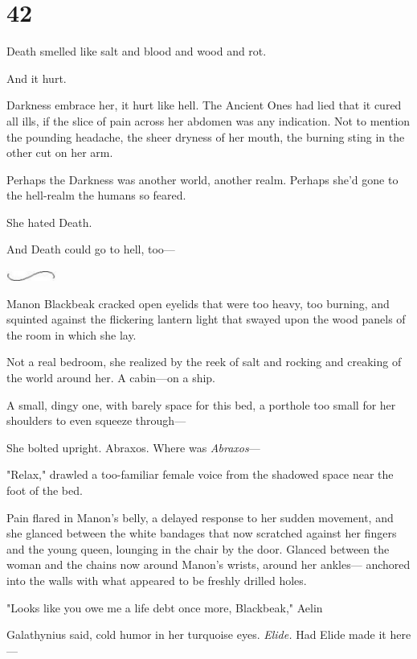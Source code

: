 
\chapter{42}

Death smelled like salt and blood and wood and rot.

And it hurt.

Darkness embrace her, it hurt like hell. The Ancient Ones had lied that it cured all ills, if the slice of pain across her abdomen was any indication. Not to mention the pounding headache, the sheer dryness of her mouth, the burning sting in the other cut on her arm.

Perhaps the Darkness was another world, another realm. Perhaps she'd gone to the hell-realm the humans so feared.

She hated Death.

And Death could go to hell, too---

\includegraphics[width=0.65in,height=0.13in]{images/seperator}

Manon Blackbeak cracked open eyelids that were too heavy, too burning, and squinted against the flickering lantern light that swayed upon the wood panels of the room in which she lay.

Not a real bedroom, she realized by the reek of salt and rocking and creaking of the world around her. A cabin---on a ship.

A small, dingy one, with barely space for this bed, a porthole too small for her shoulders to even squeeze through---

She bolted upright. Abraxos. Where was \emph{Abraxos}---

"Relax," drawled a too-familiar female voice from the shadowed space near the foot of the bed.

Pain flared in Manon's belly, a delayed response to her sudden movement, and she glanced between the white bandages that now scratched against her fingers and the young queen, lounging in the chair by the door. Glanced between the woman and the chains now around Manon's wrists, around her ankles--- anchored into the walls with what appeared to be freshly drilled holes.

"Looks like you owe me a life debt once more, Blackbeak," Aelin

Galathynius said, cold humor in her turquoise eyes. \emph{Elide.} Had Elide made it here---


